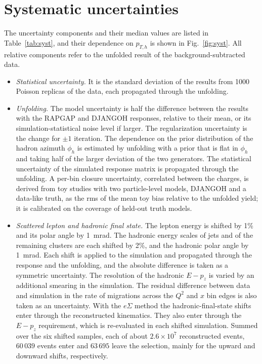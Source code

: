 \documentclass[11pt,a4paper]{article}
\newcommand{\Qsq}{Q^{2}}
\newcommand{\pTh}{p_{T,h}}
\begin{document}
\section{Systematic uncertainties}
\label{sec:systematics}

The uncertainty components and their median values are listed in Table~\ref{tab:syst}, and their dependence on $\pTh$ is shown in Fig.~\ref{fig:syst}. All relative components refer to the unfolded result of the background-subtracted data.

\begin{itemize}
  \item \textit{Statistical uncertainty.} It is the standard deviation of the results from 1000 Poisson replicas of the data, each propagated through the unfolding.
  \item \textit{Unfolding.} The model uncertainty is half the difference between the results with the RAPGAP and DJANGOH responses, relative to their mean, or its simulation-statistical noise level if larger. The regularization uncertainty is the change for $\pm1$ iteration. The dependence on the prior distribution of the hadron azimuth $\phi_{h}$ is estimated by unfolding with a prior that is flat in $\phi_{h}$ and taking half of the larger deviation of the two generators. The statistical uncertainty of the simulated response matrix is propagated through the unfolding. A per-bin closure uncertainty, correlated between the charges, is derived from toy studies with two particle-level models, DJANGOH and a data-like truth, as the rms of the mean toy bias relative to the unfolded yield; it is calibrated on the coverage of held-out truth models.
  \item \textit{Scattered lepton and hadronic final state.} The lepton energy is shifted by 1\% and its polar angle by 1~mrad. The hadronic energy scales of jets and of the remaining clusters are each shifted by 2\%, and the hadronic polar angle by 1~mrad. Each shift is applied to the simulation and propagated through the response and the unfolding, and the absolute difference is taken as a symmetric uncertainty. The resolution of the hadronic $E-p_{z}$ is varied by an additional smearing in the simulation. The residual difference between data and simulation in the rate of migrations across the $\Qsq$ and $x$ bin edges is also taken as an uncertainty. With the $e\Sigma$ method the hadronic-final-state shifts enter through the reconstructed kinematics. They also enter through the $E-p_{z}$ requirement, which is re-evaluated in each shifted simulation. Summed over the six shifted samples, each of about $2.6\times10^{7}$ reconstructed events, $60\,039$ events enter and $63\,695$ leave the selection, mainly for the upward and downward shifts, respectively.

\end{itemize}
\end{document}
